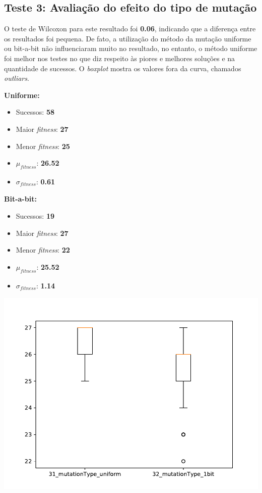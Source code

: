 \documentclass[11pt,a4paper]{article}
\begin{document}
\subsection{Teste 3: Avaliação do efeito do tipo de mutação}
O teste de Wilcoxon para este resultado foi \textbf{0.06}, indicando que a diferença entre os resultados foi pequena. De fato, a utilização do método da mutação uniforme ou bit-a-bit não influenciaram muito no resultado, no entanto, o método uniforme foi melhor nos testes no que diz respeito às piores e melhores soluções e na quantidade de sucessos. O \textit{boxplot} mostra os valores fora da curva, chamados \textit{outliars}.\\

\begin{minipage}{0.25\linewidth}
\textbf{Uniforme:}
\begin{itemize}
	\footnotesize
	\setlength\itemsep{0em}
	\item Sucessos: \textbf{58}
	\item Maior \textit{fitness}: \textbf{27}
	\item Menor \textit{fitness}: \textbf{25}
	\item $\mu_{\textit{fitness}}$: \textbf{26.52}
	\item $\sigma_{\textit{fitness}}$: \textbf{0.61}
\end{itemize}
\end{minipage}
\begin{minipage}{0.25\linewidth}
\textbf{Bit-a-bit:}
\begin{itemize}
	\footnotesize
	\setlength\itemsep{0em}
	\item Sucessos: \textbf{19}
	\item Maior \textit{fitness}: \textbf{27}
	\item Menor \textit{fitness}: \textbf{22}
	\item $\mu_{\textit{fitness}}$: \textbf{25.52}
	\item $\sigma_{\textit{fitness}}$: \textbf{1.14}
\end{itemize}
\end{minipage}
\begin{minipage}{0.4\linewidth}
\includegraphics[scale=0.5]{teste3.pdf} 
\end{minipage}
\end{document}
